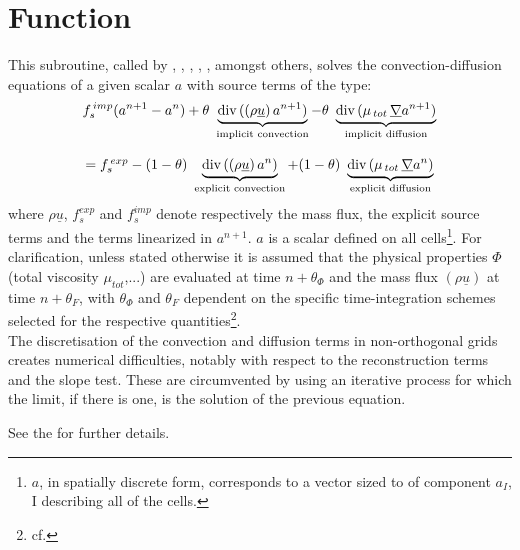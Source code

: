 \section*{Function}
This subroutine, called by , , ,
, , amongst others, solves the convection-diffusion equations
of a given scalar $a$ with source terms of the type:
\begin{equation}\label{Base_Codits_eq_ref}
\begin{array}{c}
\displaystyle f_s^{\,imp} (a^{n+1} - a^{n}) +
\theta \ \underbrace{\text{div}\,((\rho \underline{u})\,a^{n+1})}_{\text{implicit convection}}
-\theta \ \underbrace{\text{div}\,(\mu_{\,tot}\,\underline{\nabla} a^{n+1})}_{\text{implicit diffusion}}
\\\\
= f_s^{\,exp}-(1-\theta) \ \underbrace{\text{div}\,((\rho \underline{u})\,a^{n})}_{\text{explicit convection}}
 + (1-\theta) \ \underbrace{\text{div}\,(\mu_{\,tot}\,\underline{\nabla} a^{n})}_{\text{explicit diffusion}}
\end{array}
\end{equation}
where $\rho \underline{u}$, $f_s^{exp}$ and $f_s^{imp}$ denote respectively the mass flux, the explicit source terms and the terms linearized in $a^{n+1}$.
$a$ is a scalar defined on all cells\footnote{$a$, in spatially discrete form, corresponds to a vector sized to  of component $a_I$, I describing all of the cells.}.
For clarification, unless stated otherwise it is assumed that the physical properties $\Phi$ (total
viscosity $\mu_{tot}$,...) are evaluated at time $n+\theta_\Phi$ and the mass flux $(\rho\underline{u})$
at time $n+\theta_F$, with $\theta_\Phi$ and $\theta_F$ dependent on the specific time-integration schemes
selected for the respective quantities\footnote{cf. }.
\\
The discretisation of the convection and diffusion terms in non-orthogonal grids creates numerical difficulties, notably with respect to the reconstruction terms and the slope test. These are circumvented by using an iterative process for which the limit, if there is one, is the solution of the previous equation.

See the 
for further details.

